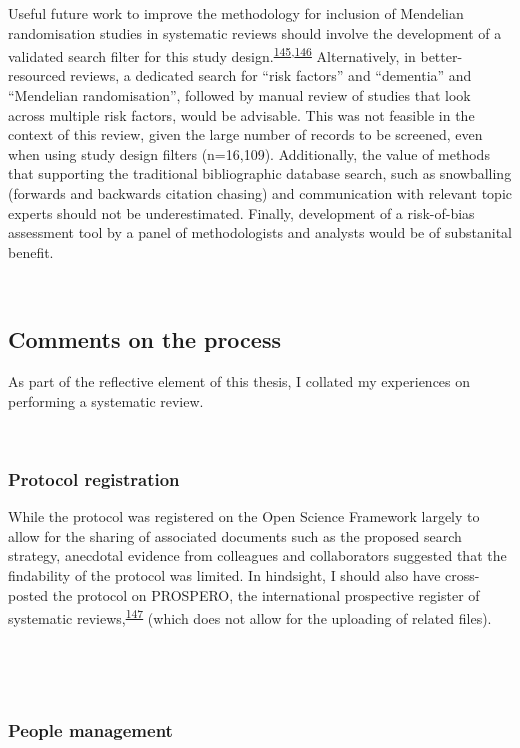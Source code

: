 \documentclass[a4paper, twoside]{templates/ociamthesis}
\begin{document}
Useful future work to improve the methodology for inclusion of Mendelian randomisation studies in systematic reviews should involve the development of a validated search filter for this study design.\textsuperscript{\protect\hyperlink{ref-waffenschmidt2020}{145},\protect\hyperlink{ref-wagner2020}{146}} Alternatively, in better-resourced reviews, a dedicated search for ``risk factors'' and ``dementia'' and ``Mendelian randomisation'', followed by manual review of studies that look across multiple risk factors, would be advisable. This was not feasible in the context of this review, given the large number of records to be screened, even when using study design filters (n=16,109). Additionally, the value of methods that supporting the traditional bibliographic database search, such as snowballing (forwards and backwards citation chasing) and communication with relevant topic experts should not be underestimated. Finally, development of a risk-of-bias assessment tool by a panel of methodologists and analysts would be of substanital benefit.

~

\hypertarget{comments-on-the-process}{%
\subsection{Comments on the process}\label{comments-on-the-process}}

As part of the reflective element of this thesis, I collated my experiences on performing a systematic review.

~

\hypertarget{protocol-registration}{%
\subsubsection{Protocol registration}\label{protocol-registration}}

While the protocol was registered on the Open Science Framework largely to allow for the sharing of associated documents such as the proposed search strategy, anecdotal evidence from colleagues and collaborators suggested that the findability of the protocol was limited. In hindsight, I should also have cross-posted the protocol on PROSPERO, the international prospective register of systematic reviews,\textsuperscript{\protect\hyperlink{ref-booth2011}{147}} (which does not allow for the uploading of related files).

~

~

\hypertarget{people-management}{%
\subsubsection{People management}\label{people-management}}
\end{document}
